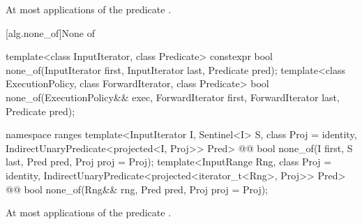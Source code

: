 \begin{itemdescr}
\pnum
{}

\pnum
{}


\pnum
\complexity At most  applications of the predicate
.
\end{itemdescr}

[alg.none_of]{None of}

%
\begin{itemdecl}
template<class InputIterator, class Predicate>
  constexpr bool none_of(InputIterator first, InputIterator last, Predicate pred);
template<class ExecutionPolicy, class ForwardIterator, class Predicate>
  bool none_of(ExecutionPolicy&& exec, ForwardIterator first, ForwardIterator last,
               Predicate pred);
\end{itemdecl}\begin{addedblock}\begin{itemdecl}
namespace ranges {
  template<InputIterator I, Sentinel<I> S, class Proj = identity,
      IndirectUnaryPredicate<projected<I, Proj>> Pred>
    @@ bool none_of(I first, S last, Pred pred, Proj proj = Proj{});
  template<InputRange Rng, class Proj = identity,
      IndirectUnaryPredicate<projected<iterator_t<Rng>, Proj>> Pred>
    @@ bool none_of(Rng&& rng, Pred pred, Proj proj = Proj{});
}
\end{itemdecl}\end{addedblock}

\begin{itemdescr}
\pnum
{}

\pnum
{}


\pnum
\complexity At most  applications of the predicate
.
\end{itemdescr}

